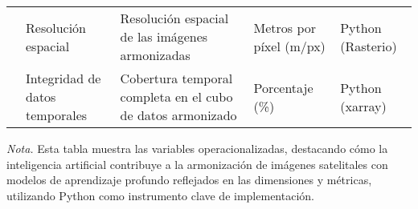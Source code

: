 \begin{table}[H]
\begin{spacing}{8}
\begin{tabularx}{\linewidth}{P{2.5cm}P{2.6cm}P{4cm}P{2.5cm}P{2.5cm}}
            \addlinespace
            & Resolución espacial & Resolución espacial de las imágenes armonizadas & Metros por píxel (m/px) & Python (Rasterio) \\
            \addlinespace
            & Integridad de datos temporales & Cobertura temporal completa en el cubo de datos armonizado & Porcentaje (\%) & Python (xarray) \\
            \bottomrule
        \end{tabularx}
    \end{spacing}
    \vspace{1\baselineskip}
    \textit{Nota.} Esta tabla muestra las variables operacionalizadas, destacando cómo la inteligencia artificial contribuye a la armonización de imágenes satelitales con modelos de aprendizaje profundo reflejados en las dimensiones y métricas, utilizando Python como instrumento clave de implementación.
    \label{UsoLandsat1}
\end{table}





\vspace*{2mm}

